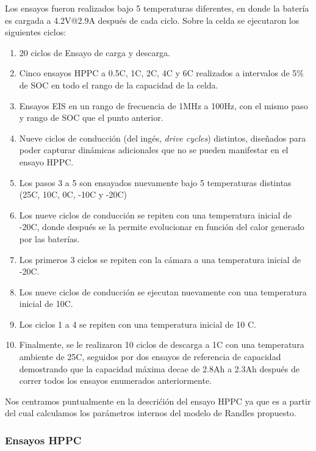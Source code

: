 \documentclass[10pt, a4paper]{report}
\begin{document}
Los ensayos fueron realizados bajo 5 temperaturas diferentes, en donde la
bater\'ia es cargada a 4.2V@2.9A despu\'es de cada ciclo. Sobre la celda se
ejecutaron los siguientes ciclos:

\begin{enumerate}
    \item 20 ciclos de Ensayo de carga y descarga.
    \item Cinco ensayos \acrshort{HPPC} a 0.5C, 1C, 2C, 4C y 6C realizados a
        intervalos de 5\% de \acrshort{SOC} en todo el rango de la capacidad de
        la celda.
    \item Ensayos \acrshort{EIS} en un rango de frecuencia de 1MHz a 100Hz, con
        el mismo paso y rango de \acrshort{SOC} que el punto anterior.
    \item Nueve ciclos de conducci\'on (del ing\'es, \emph{drive cycles})
        distintos, diseñados para poder capturar din\'amicas adicionales que no
        se pueden manifestar en el ensayo \acrshort{HPPC}.
    \item Los pasos 3 a 5 son ensayados nuevamente bajo 5 temperaturas distintas
        (25\degree C, 10\degree C, 0\degree C, -10\degree C y -20\degree C)
    \item Los nueve ciclos de conducci\'on se repiten con una temperatura
        inicial de -20\degree C, donde despu\'es se la permite evolucionar en
        funci\'on del calor generado por las bater\'ias.
    \item Los primeros 3 ciclos se repiten con la c\'amara a una temperatura
        inicial de -20\degree C.
    \item Los nueve ciclos de conducci\'on se ejecutan nuevamente con una
        temperatura inicial de 10\degree C.
    \item Los ciclos 1 a 4 se repiten con una temperatura inicial de 10\degree
        C.
    \item Finalmente, se le realizaron 10 ciclos de descarga a 1C con una
        temperatura ambiente de 25\degree C, seguidos por dos ensayos de
        referencia de capacidad demostrando que la capacidad m\'axima decae de
        2.8Ah a 2.3Ah despu\'es de correr todos los ensayos enumerados
        anteriormente.
\end{enumerate}

Nos centramos puntualmente en la descrićión del ensayo \acrshort{HPPC} ya que es
a partir del cual calculamos los parámetros internos del modelo de Randles
propuesto.

\subsubsection{Ensayos HPPC}\label{ensayo_HPPC}
\end{document}
